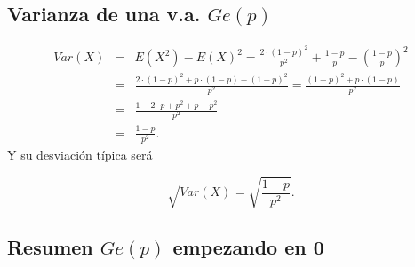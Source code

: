 \documentclass[]{book}
\begin{document}
\hypertarget{varianza-de-una-v.a.-gep}{%
\subsection{\texorpdfstring{Varianza de una v.a. \(Ge(p)\)}{Varianza de una v.a. Ge(p)}}\label{varianza-de-una-v.a.-gep}}

\[
\begin{eqnarray*}
Var(X)&=&E(X^2)-E(X)^2=\frac{2\cdot (1-p)^2}{p^2}+\frac{1-p}{p}-\left(\frac{1-p}{p}\right)^2\\
&=&
\frac{2\cdot (1-p)^2+p\cdot(1-p)-(1-p)^2}{p^2}=\frac{(1-p)^2+p\cdot(1-p)}{p^2}\\
&=&
\frac{1-2\cdot p + p^2+p-p^2}{p^2}\\
&=& \frac{1-p}{p^2}.
\end{eqnarray*}
\]
Y su desviación típica será

\[\sqrt{Var(X)}=\sqrt{\frac{1-p}{p^2}}.\]

\hypertarget{resumen-gep-empezando-en-0}{%
\subsection{\texorpdfstring{Resumen \(Ge(p)\) empezando en 0}{Resumen Ge(p) empezando en 0}}\label{resumen-gep-empezando-en-0}}
\end{document}
